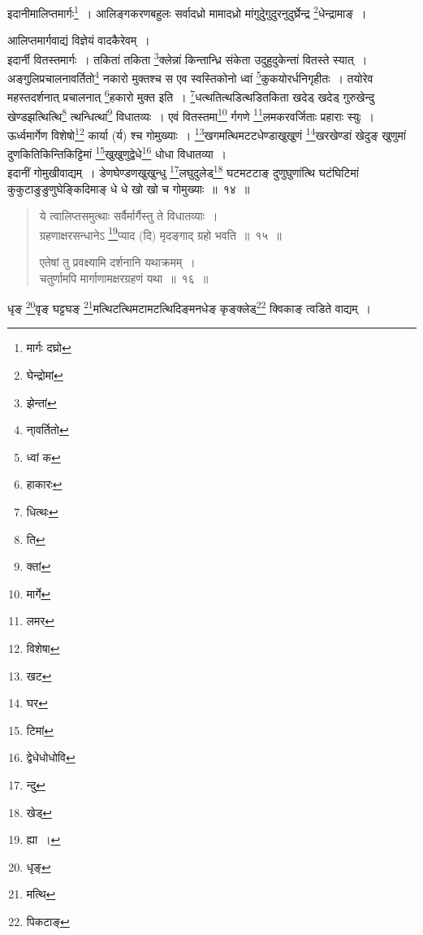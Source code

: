 \documentclass[11pt, openany]{book}
\begin{document}
{\qt इदानीमालिप्तमार्गः\renewcommand{\thefootnote}{13}\footnote{मार्गः दघ्रो}~। आलिङ्गकरणबहुलः सर्वादध्रो मामादध्रो मांगुदु्ेगुदुरनुदुर्घ्रेन्द्र \renewcommand{\thefootnote}{14}\footnote{घेन्द्रोमां}धेन्द्रामाङ्~।}

\newpage

{\qt आलिप्तमार्गवाद्यं विज्ञेयं वादकैरेवम्~।}\\

{\qt इदार्नी वितस्तमार्गः~। तकितां तकिता \renewcommand{\thefootnote}{1}\footnote{झेन्तां}क्लेन्नां किन्तान्ध्रि  संकेता उदुहुदुकेन्तां वितस्ते  स्यात्~। अङ्गुलिप्रचालनावर्तितो\renewcommand{\thefootnote}{2}\footnote{ना्वर्तितो} नकारो मुक्तश्च स एव स्वस्तिकोनो ध्वां \renewcommand{\thefootnote}{3}\footnote{ध्वां क}कुकयोरर्धनिगृहीतः~। तयोरेव महस्तदर्शनात् प्रचालनात् \renewcommand{\thefootnote}{4}\footnote{हाकारः}हकारो मुक्त इति~। \renewcommand{\thefootnote}{5}\footnote{धित्थः}धत्थतित्थडित्थडितकिता खदेड् खदेड् गुरुखेन्दु खेण्डझत्थित्थि\renewcommand{\thefootnote}{6}\footnote{ति} त्थन्धित्थां\renewcommand{\thefootnote}{7}\footnote{क्तां} विधातव्यः~। एवं वितस्तमा\renewcommand{\thefootnote}{8}\footnote{मार्गे} र्गगणे \renewcommand{\thefootnote}{9}\footnote{लमर}लमकरवर्जिताः प्रहाराः स्युः~। ऊर्ध्वमार्गेण विशेषो\renewcommand{\thefootnote}{10}\footnote{विशेषा} कार्या (र्य) श्च गोमुख्याः~। \renewcommand{\thefootnote}{11}\footnote{खट}खगमत्थिमटटधेण्डाखुखुणं \renewcommand{\thefootnote}{12}\footnote{घर}खरखेण्डां खेदुङ् खुणुमां दुणकितिकिन्तिकिट्टिमां \renewcommand{\thefootnote}{13}\footnote{टिमां}खुखुणुद्वेधे\renewcommand{\thefootnote}{14}\footnote{द्वेधेधोधोवि} धोधा विधातव्या~।}\\

{\qt इदानीं गोमुखीवाद्यम्~। डेणघेण्डणखुखुन्धु \renewcommand{\thefootnote}{15}\footnote{न्दु}लघुदुलेड्\renewcommand{\thefootnote}{16}\footnote{खेड्} घटमटटाङ् दुणुघुणांत्थि घटंघिटिमां कुकुटाङुङुणुघेङ्किदिमाङ् धे धे खो खो च गोमुख्याः~॥~१४~॥}

\begin{quote}
{\na  ये त्वालिप्तसमुत्थाः सर्वैर्मार्गैस्तु ते विधातव्याः~।\\
 ग्रहणाक्षरसन्धानेऽ \renewcommand{\thefootnote}{17}\footnote{ह्या~।}प्याद (दि) मृदङ्गाद् ग्रहो भवति~॥~१५~॥

 एतेषां तु प्रवक्ष्यामि दर्शनानि यथाक्रमम्~।\\
 चतुर्णामपि मार्गाणामक्षरग्रहणं यथा~॥~१६~॥}
\end{quote}

{\qt धृङ् \renewcommand{\thefootnote}{18}\footnote{धृङ्}वृङ् घट्टघङ् \renewcommand{\thefootnote}{19}\footnote{मत्थि}मत्थिटत्थिमटामटत्थिदिङ्मनधेङ् कृङ्क्लेड्\renewcommand{\thefootnote}{20}\footnote{पिकटाङ्} क्विकाङ् त्वडिते वाद्यम्~।}\\
\end{document}
